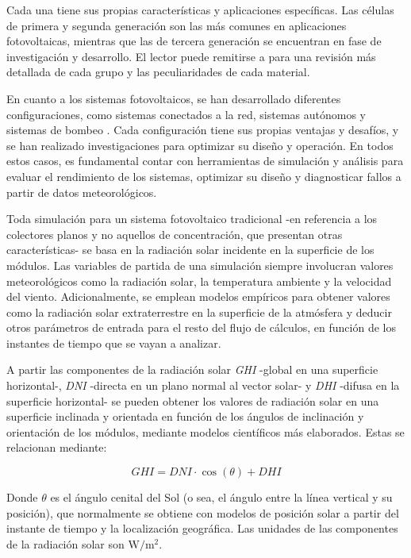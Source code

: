Cada una tiene sus propias características y aplicaciones específicas. Las células de primera y segunda generación son las más comunes en aplicaciones fotovoltaicas, mientras que las de tercera generación se encuentran en fase de investigación y desarrollo. El lector puede remitirse a \cite{Shubbak_2019} para una revisión más detallada de cada grupo y las peculiaridades de cada material.

En cuanto a los sistemas fotovoltaicos, se han desarrollado diferentes configuraciones, como sistemas conectados a la red, sistemas autónomos y sistemas de bombeo \cite{Perpinan2020}. Cada configuración tiene sus propias ventajas y desafíos, y se han realizado investigaciones para optimizar su diseño y operación. En todos estos casos, es fundamental contar con herramientas de simulación y análisis para evaluar el rendimiento de los sistemas, optimizar su diseño y diagnosticar fallos a partir de datos meteorológicos.

Toda simulación para un sistema fotovoltaico tradicional -en referencia a los colectores planos y no aquellos de concentración, que presentan otras características- se basa en la radiación solar incidente en la superficie de los módulos. Las variables de partida de una simulación siempre involucran valores meteorológicos como la radiación solar, la temperatura ambiente y la velocidad del viento. Adicionalmente, se emplean modelos empíricos para obtener valores como la radiación solar extraterrestre en la superficie de la atmósfera y deducir otros parámetros de entrada para el resto del flujo de cálculos, en función de los instantes de tiempo que se vayan a analizar.

A partir las componentes de la radiación solar \textit{GHI} -global en una superficie horizontal-, \textit{DNI} -directa en un plano normal al vector solar- y \textit{DHI} -difusa en la superficie horizontal- se pueden obtener los valores de radiación solar en una superficie inclinada y orientada en función de los ángulos de inclinación y orientación de los módulos, mediante modelos científicos más elaborados. Estas se relacionan mediante:

\begin{equation}
      GHI = DNI \cdot \cos(\theta) + DHI
\end{equation}

Donde $\theta$ es el ángulo cenital del Sol (o sea, el ángulo entre la línea vertical y su posición), que normalmente se obtiene con modelos de posición solar a partir del instante de tiempo y la localización geográfica. Las unidades de las componentes de la radiación solar son $\si{\watt\per\meter\squared}$.

